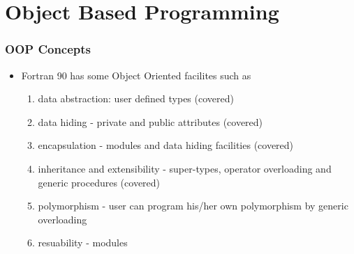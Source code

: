 \documentclass[c,mathserif,compress,xcolor=svgnames]{beamer}
\begin{document}
\section{Object Based Programming}
\begin{frame}
  \frametitle{\small OOP Concepts}
  \begin{itemize}
    \item Fortran 90 has some Object Oriented facilites such as
    \begin{enumerate}
      \item data abstraction: user defined types (covered)
      \item data hiding - private and public attributes (covered)
      \item encapsulation - modules and data hiding facilities (covered)
      \item inheritance and extensibility - super-types, operator overloading and generic procedures (covered)
      \item polymorphism - user can program his/her own polymorphism by generic overloading
      \item resuability - modules
    \end{enumerate}
  \end{itemize}
\end{frame}
\end{document}
